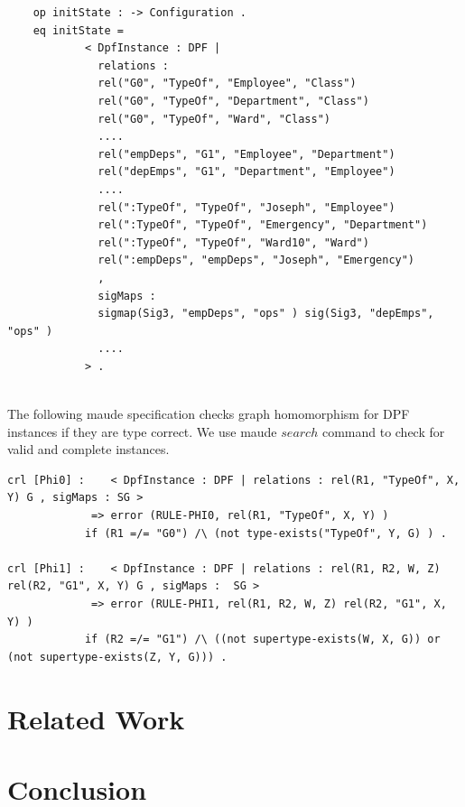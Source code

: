 \documentclass{eceasst}
\begin{document}
\tiny
\begin{verbatim}
	op initState : -> Configuration .
	eq initState = 
			< DpfInstance : DPF | 
			  relations : 
			  rel("G0", "TypeOf", "Employee", "Class")
			  rel("G0", "TypeOf", "Department", "Class")
			  rel("G0", "TypeOf", "Ward", "Class")			  
			  ....
			  rel("empDeps", "G1", "Employee", "Department")
			  rel("depEmps", "G1", "Department", "Employee")
			  ....			  
			  rel(":TypeOf", "TypeOf", "Joseph", "Employee") 
			  rel(":TypeOf", "TypeOf", "Emergency", "Department") 
			  rel(":TypeOf", "TypeOf", "Ward10", "Ward") 			  
			  rel(":empDeps", "empDeps", "Joseph", "Emergency") 			  
			  ,
			  sigMaps : 
			  sigmap(Sig3, "empDeps", "ops" ) sig(Sig3, "depEmps", "ops" )
			  ....
			> .
 
\end{verbatim}
\normalsize

The following maude specification checks graph homomorphism for DPF instances if they are type correct. We use maude $search$ command to check for valid and complete instances. 


\tiny
\begin{verbatim}
crl [Phi0] :	< DpfInstance : DPF | relations : rel(R1, "TypeOf", X, Y) G , sigMaps : SG > 
			 => error (RULE-PHI0, rel(R1, "TypeOf", X, Y) )
			if (R1 =/= "G0") /\ (not type-exists("TypeOf", Y, G) ) .

crl [Phi1] :	< DpfInstance : DPF | relations : rel(R1, R2, W, Z) rel(R2, "G1", X, Y) G , sigMaps :  SG > 
			 => error (RULE-PHI1, rel(R1, R2, W, Z) rel(R2, "G1", X, Y) )
			if (R2 =/= "G1") /\ ((not supertype-exists(W, X, G)) or (not supertype-exists(Z, Y, G))) .
\end{verbatim}

\normalsize


 
\section{Related Work}\label{lbl:relatedwork}



\section{Conclusion}\label{lbl:conclusion}
 


{}
\end{document}
